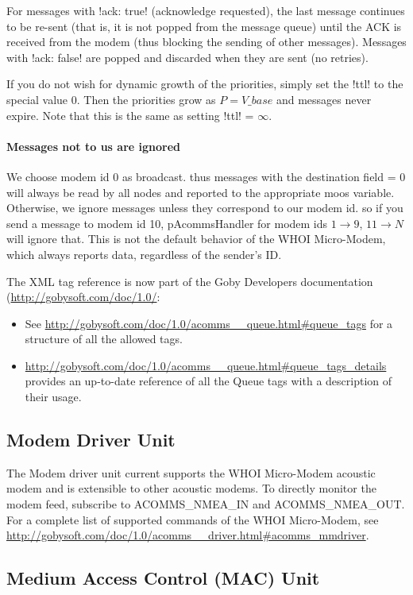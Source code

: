For messages with !ack: true! (acknowledge requested), the last message continues to be re-sent (that is, it is not popped from the message queue) until the ACK is received from the modem (thus blocking the sending of other messages). Messages with !ack: false! are popped and discarded when they are sent (no retries).

If you do not wish for dynamic growth of the priorities, simply set the !ttl! to the special value 0. Then the priorities grow as $P = V\_{base}$ and messages never expire. Note that this is the same as setting !ttl! = $\infty$.

\paragraph{Messages not to us are ignored} We choose modem id 0 as broadcast. thus messages with the destination field = 0 will always be read by all nodes and reported to the
  appropriate moos variable. Otherwise, we ignore messages unless they correspond to our modem id. so if you send a message to modem id 10, pAcommsHandler for modem ids $1 \rightarrow 9$, $11\rightarrow N$  will ignore that. This is not the default behavior of the WHOI Micro-Modem, which always reports data, regardless of the sender's ID.
  
The XML tag reference is now part of the Goby Developers documentation (\url{http://gobysoft.com/doc/1.0/}:
\begin{itemize}
\item See \url{http://gobysoft.com/doc/1.0/acomms__queue.html#queue_tags} for a structure of all the allowed tags.
\item \url{http://gobysoft.com/doc/1.0/acomms__queue.html#queue_tags_details} provides an up-to-date reference of all the Queue tags with a description of their usage.
\end{itemize}  

\subsection{Modem Driver Unit}

The Modem driver unit current supports the WHOI Micro-Modem acoustic modem and is extensible to other acoustic modems. To directly monitor the modem feed, subscribe to ACOMMS\_NMEA\_IN and ACOMMS\_NMEA\_OUT. For a complete list of supported commands of the WHOI Micro-Modem, see \url{http://gobysoft.com/doc/1.0/acomms__driver.html#acomms_mmdriver}.

\subsection{Medium Access Control (MAC) Unit}

